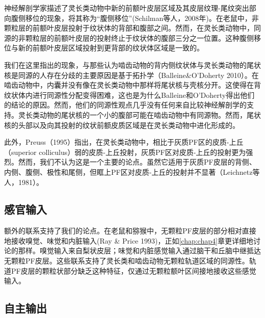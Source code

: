 神经解剖学家描述了灵长类动物中新的前额叶皮层区域及其皮层纹理-尾纹突出部向腹侧移位的现象，将其称为“腹侧移位”(Schilman等人，2008年)。在老鼠中，非颗粒层的前额叶皮层投射于纹状体的背部和腹部之间。然而，在灵长类动物中，同源的非颗粒层的前额叶皮层的投射终止于纹状体的腹部三分之一位置。这种腹侧移位与新的前额叶皮层区域投射到更背部的纹状体区域是一致的。

我们在这里指出的现象，与那些认为啮齿动物的背内侧纹状体与灵长类动物的尾状核是同源的人存在分歧的主要原因是基于拓扑学（Balleine\&O'Doherty 2010）。在啮齿动物中，内囊并没有像在灵长类动物中那样将尾状核与壳核分开。这使得在背纹状体内进行同源性分配变得困难，这也是为什么Balleine和O'Doherty得出他们的结论的原因。然而，他们的同源性观点几乎没有任何来自比较神经解剖学的支持。灵长类动物的尾状核的一个小的腹部可能在啮齿动物中有同源物。然而，尾状核的头部以及向其投射的纹状前额皮质区域是在灵长类动物中进化形成的。

此外，Preuss（1995）指出，在灵长类动物中，相比于灰质PF区的皮质-上丘（superior colliculus）弱的皮质-上丘投射，灰质PF区对皮质-上丘的投射更为强烈。然而，我们不认为这是一个主要的论点。虽然它适用于灰质PF皮层的背侧、内侧、腹侧、极性和尾侧，但眶上PF区对皮质-上丘的投射并不显著（Leichnetz等人，1981）。

\subsection{感官输入}
额外的联系支持了我们的论点。在老鼠和猕猴中，无颗粒PF皮层的部分相对直接地接收嗅觉、味觉和内脏输入(Ray \& Price 1993)，正如\ref{chap:chap4}章更详细地讨论的那样。嗅觉输入来自梨状皮层；味觉和内脏感觉输入通过脑干和丘脑中继抵达无颗粒PF皮层。这些联系支持了灵长类和啮齿动物无颗粒轨道区域的同源性。轨道PF皮层的颗粒状部分缺乏这种特征，仅通过无颗粒额叶区间接地接收这些感觉输入。

\subsection{自主输出}

